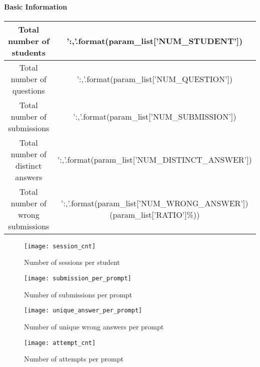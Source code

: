 \documentclass[12pt]{article} %
\begin{document}
\setlength{\pdfpageheight}{\paperheight}
\setlength{\pdfpagewidth}{\paperwidth}
\setlength{\parindent}{0pt} %
\setlength{\parskip}{2ex} %

\paragraph{Basic Information}
\begin{center}
	\begin{tabular}{cc}
		\toprule
		Total number of students & {{'{:,}'.format(param_list['NUM_STUDENT'])}} \\\midrule
		Total number of questions & {{'{:,}'.format(param_list['NUM_QUESTION'])}} \\\midrule
		Total number of submissions & {{'{:,}'.format(param_list['NUM_SUBMISSION'])}} \\\midrule
		Total number of distinct answers & {{'{:,}'.format(param_list['NUM_DISTINCT_ANSWER'])}} \\\midrule
		Total number of wrong submissions & {{'{:,}'.format(param_list['NUM_WRONG_ANSWER'])}}({{param_list['RATIO']}}\%)) \\\bottomrule
	\end{tabular}
\end{center}

\begin{figure}[!ht]
	\centering
	\texttt{[image: session\_cnt]}
	\caption{Number of sessions per student}
\end{figure}

\begin{figure}[!ht]
	\centering
	\texttt{[image: submission\_per\_prompt]}
	\caption{Number of submissions per prompt}
\end{figure}

\begin{figure}[!ht]
	\centering
	\texttt{[image: unique\_answer\_per\_prompt]}
	\caption{Number of unique wrong answers per prompt}
\end{figure}

\begin{figure}[!ht]
	\centering
	\texttt{[image: attempt\_cnt]}
	\caption{Number of attempts per prompt}
\end{figure}
\end{document}
